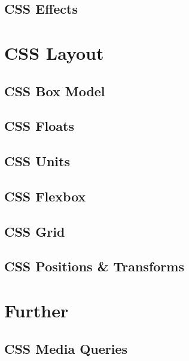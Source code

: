 \documentclass[b5paper,openany]{book}
\begin{document}
\section{CSS Effects}


%


\chapter{CSS Layout}

\section{CSS Box Model}


\section{CSS Floats}


\section{CSS Units}


\section{CSS Flexbox}


\section{CSS Grid}


\section{CSS Positions \& Transforms}



\chapter{Further}

\section{CSS Media Queries}

\end{document}

